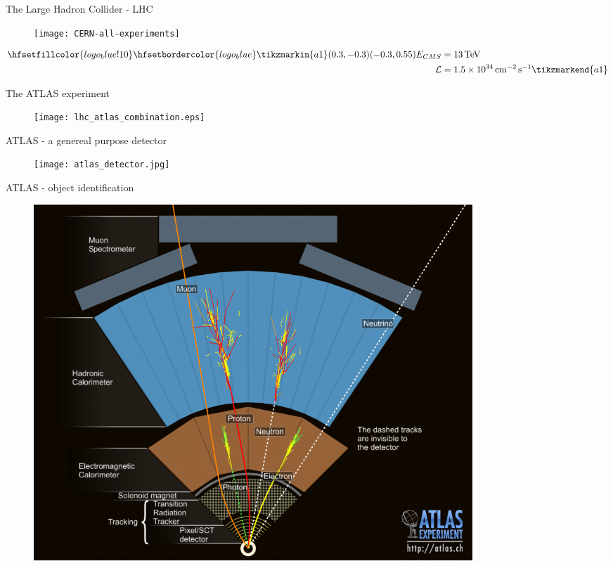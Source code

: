\begin{frame}{The Large Hadron Collider - LHC}
    \begin{figure}
        \centering
        \texttt{[image: CERN-all-experiments]}
        \caption{\cite{Pequenao:1095924}}
        \label{fig:my_label}
    \end{figure}
     \begin{align*}
        \hfsetfillcolor{logo_blue!10}
        \hfsetbordercolor{logo_blue}
        \tikzmarkin{a1}(0.3,-0.3)(-0.3,0.55)
        E_{CMS} &= \SI{13}{\tera \electronvolt}\\ 
        \mathcal{L} &= \SI{1.5e34}{\per \square \centi \metre  \per \second} 
        \tikzmarkend{a1}
    \end{align*}
\end{frame}

\begin{frame}{The ATLAS experiment}
    \begin{figure}
        \centering
        \texttt{[image: lhc\_atlas\_combination.eps]}
        \caption{\cite{Pequenao:1095924}}
        \label{fig:my_label}
    \end{figure}
\end{frame}

\begin{frame}{ATLAS - a genereal purpose detector}
    \begin{figure}
        \centering
        \texttt{[image: atlas\_detector.jpg]}
        \caption{\cite{Pequenao:1095924}}
        \label{fig:my_label}
    \end{figure}
\end{frame}


\begin{frame}{ATLAS - object identification}
    \begin{figure}
        \centering
        \includegraphics[width=0.8\textwidth]{figures_theory/atlas_quer.jpg}
        \caption{\cite{Pequenao:1095924}}
        \label{fig:my_label}
    \end{figure}
\end{frame}




